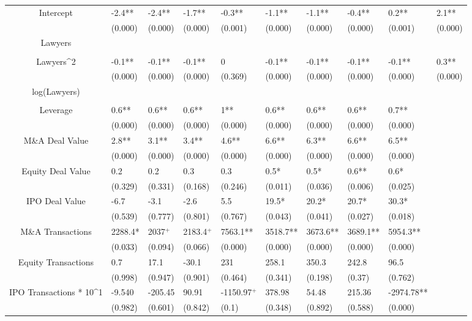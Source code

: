 \documentclass{article}
\begin{document}
\begin{table}[H]
\begin{tabular}{|clllllllll|}
Intercept & -2.4** & -2.4** & -1.7** & -0.3** & -1.1** & -1.1** & -0.4** & 0.2** & 2.1** \\
   & (0.000) & (0.000) & (0.000) & (0.001) & (0.000) & (0.000) & (0.000) & (0.001) & (0.000) \\
  Lawyers &  &  &  &  &  &  &  &  &  \\
   &  &  &  &  &  &  &  &  &  \\
  Lawyers^2 & -0.1** & -0.1** & -0.1** & 0 & -0.1** & -0.1** & -0.1** & -0.1** & 0.3** \\
   & (0.000) & (0.000) & (0.000) & (0.369) & (0.000) & (0.000) & (0.000) & (0.000) & (0.000) \\
  log(Lawyers) &  &  &  &  &  &  &  &  &  \\
   &  &  &  &  &  &  &  &  &  \\
  Leverage & 0.6** & 0.6** & 0.6** & 1** & 0.6** & 0.6** & 0.6** & 0.7** &  \\
   & (0.000) & (0.000) & (0.000) & (0.000) & (0.000) & (0.000) & (0.000) & (0.000) &  \\
  M\&A Deal Value & 2.8** & 3.1** & 3.4** & 4.6** & 6.6** & 6.3** & 6.6** & 6.5** &  \\
   & (0.000) & (0.000) & (0.000) & (0.000) & (0.000) & (0.000) & (0.000) & (0.000) &  \\
  Equity Deal Value & 0.2 & 0.2 & 0.3 & 0.3 & 0.5* & 0.5* & 0.6** & 0.6* &  \\
   & (0.329) & (0.331) & (0.168) & (0.246) & (0.011) & (0.036) & (0.006) & (0.025) &  \\
  IPO Deal Value & -6.7 & -3.1 & -2.6 & 5.5 & 19.5* & 20.2* & 20.7* & 30.3* &  \\
   & (0.539) & (0.777) & (0.801) & (0.767) & (0.043) & (0.041) & (0.027) & (0.018) &  \\
  M\&A Transactions & 2288.4* & 2037$^{+}$ & 2183.4$^{+}$ & 7563.1** & 3518.7** & 3673.6** & 3689.1** & 5954.3** &  \\
   & (0.033) & (0.094) & (0.066) & (0.000) & (0.000) & (0.000) & (0.000) & (0.000) &  \\
  Equity Transactions & 0.7 & 17.1 & -30.1 & 231 & 258.1 & 350.3 & 242.8 & 96.5 &  \\
   & (0.998) & (0.947) & (0.901) & (0.464) & (0.341) & (0.198) & (0.37) & (0.762) &  \\
  IPO Transactions * 10^1 & -9.540 & -205.45 & 90.91 & -1150.97$^{+}$ & 378.98 & 54.48 & 215.36 & -2974.78** &  \\
   & (0.982) & (0.601) & (0.842) & (0.1) & (0.348) & (0.892) & (0.588) & (0.000) &  \\

\end{tabular}
\end{table}
\end{document}
